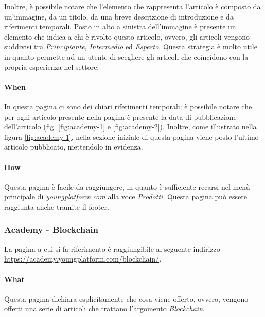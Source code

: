 Inoltre, è possibile notare che l'elemento che rappresenta l'articolo è 
composto da un'immagine, da un titolo, da una breve descrizione di 
introduzione e da riferimenti temporali. Posto in alto a sinistra 
dell'immagine è presente un elemento che indica a chi è rivolto questo 
articolo, ovvero, gli articoli vengono suddivisi tra \textit{Principiante}, 
\textit{Intermedio} ed \textit{Esperto}. Questa strategia è molto utile 
in quanto permette ad un utente di scegliere gli articoli che coincidono 
con la propria esperienza nel settore.

\paragraph{When}

In questa pagina ci sono dei chiari riferimenti temporali: è possibile 
notare che per ogni articolo presente nella pagina è presente la data di 
pubblicazione dell'articolo (fig. \ref{fig:academy-1} e 
\ref{fig:academy-2}). Inoltre, come illustrato nella figura 
\ref{fig:academy-1}, nella sezione iniziale di questa pagina viene posto 
l'ultimo articolo pubblicato, mettendolo in evidenza. 

\paragraph{How}

Questa pagina è facile da raggiungere, in quanto è sufficiente 
recarsi nel menù principale di \textit{youngplatform.com} alla voce 
\textit{Prodotti}. Questa pagina può essere raggiunta anche tramite il 
footer.

\subsubsection{Academy - Blockchain}

La pagina a cui si fa riferimento è raggiungibile al seguente indirizzo \\
\href{https://academy.youngplatform.com/blockchain/}{https://academy.youngplatform.com/blockchain/}. 

\paragraph{What}

Questa pagina dichiara esplicitamente che cosa viene offerto, ovvero, 
vengono offerti una serie di articoli che trattano l'argomento 
\textit{Blockchain}. 

